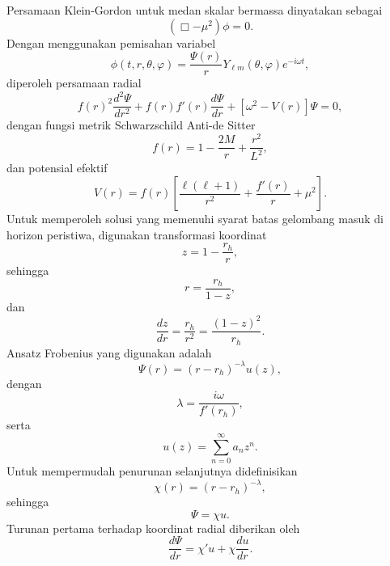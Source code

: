 Persamaan Klein-Gordon untuk medan skalar bermassa dinyatakan sebagai
\begin{equation} \left(\Box-\mu^2\right)\phi=0. \end{equation}
Dengan menggunakan pemisahan variabel
\begin{equation} \phi(t,r,\theta,\varphi) = \frac{\Psi(r)}{r} Y_{\ell m}(\theta,\varphi) e^{-i\omega t}, \end{equation}
diperoleh persamaan radial
\begin{equation} f(r)^2 \frac{d^2\Psi}{dr^2} + f(r)f'(r) \frac{d\Psi}{dr} + \left[ \omega^2 - V(r) \right] \Psi =0, \end{equation}
dengan fungsi metrik Schwarzschild Anti-de Sitter
\begin{equation} f(r) = 1-\frac{2M}{r} +\frac{r^2}{L^2}, \end{equation}
dan potensial efektif
\begin{equation} V(r) = f(r) \left[ \frac{\ell(\ell+1)}{r^2} + \frac{f'(r)}{r} + \mu^2 \right]. \end{equation}
Untuk memperoleh solusi yang memenuhi syarat batas gelombang masuk di horizon peristiwa, digunakan transformasi koordinat
\begin{equation} z = 1-\frac{r_h}{r}, \end{equation}
sehingga
\begin{equation} r = \frac{r_h}{1-z}, \end{equation}
dan
\begin{equation} \frac{dz}{dr} = \frac{r_h}{r^2} = \frac{(1-z)^2}{r_h}. \end{equation}
Ansatz Frobenius yang digunakan adalah
\begin{equation} \Psi(r) = (r-r_h)^{-\lambda} u(z), \end{equation}
dengan
\begin{equation} \lambda = \frac{i\omega}{f'(r_h)}, \end{equation}
serta
\begin{equation} u(z) = \sum_{n=0}^{\infty} a_nz^n. \end{equation}
Untuk mempermudah penurunan selanjutnya didefinisikan
\begin{equation} \chi(r) = (r-r_h)^{-\lambda}, \end{equation}
sehingga
\begin{equation} \Psi = \chi u. \end{equation}
Turunan pertama terhadap koordinat radial diberikan oleh
\begin{equation} \frac{d\Psi}{dr} = \chi'u + \chi \frac{du}{dr}. \end{equation}
